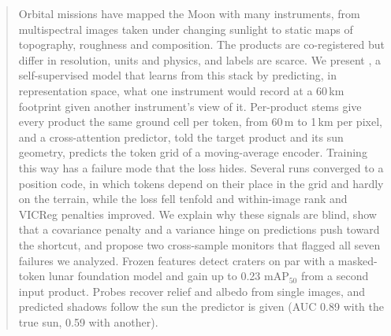 \begin{abstract}
Orbital missions have mapped the Moon with many instruments, from multispectral images taken under changing sunlight to static maps of topography, roughness and composition. The products are co-registered but differ in resolution, units and physics, and labels are scarce. We present \method, a self-supervised model that learns from this stack by predicting, in representation space, what one instrument would record at a 60\,km footprint given another instrument's view of it. Per-product stems give every product the same ground cell per token, from 60\,m to 1\,km per pixel, and a cross-attention predictor, told the target product and its sun geometry, predicts the token grid of a moving-average encoder. Training this way has a failure mode that the loss hides. Several runs converged to a position code, in which tokens depend on their place in the grid and hardly on the terrain, while the loss fell tenfold and within-image rank and VICReg penalties improved. We explain why these signals are blind, show that a covariance penalty and a variance hinge on predictions push toward the shortcut, and propose two cross-sample monitors that flagged all seven failures we analyzed. Frozen \method features detect craters on par with a masked-token lunar foundation model and gain up to 0.23 mAP$_{50}$ from a second input product. Probes recover relief and albedo from single images, and predicted shadows follow the sun the predictor is given (AUC 0.89 with the true sun, 0.59 with another).
\end{abstract}
